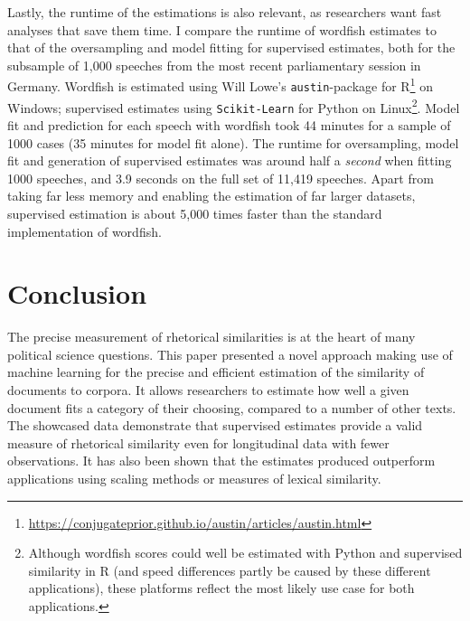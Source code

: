 \documentclass{article}
\begin{document}
Lastly, the runtime of the estimations is also relevant, as researchers want fast analyses that save them time. I compare the runtime of wordfish estimates to that of the oversampling and model fitting for supervised estimates, both for the subsample of 1,000 speeches from the most recent parliamentary session in Germany. Wordfish is estimated using Will Lowe's \texttt{austin}-package for R\footnote{\url{https://conjugateprior.github.io/austin/articles/austin.html}} on Windows; supervised estimates using \texttt{Scikit-Learn} for Python on Linux\footnote{Although wordfish scores could well be estimated with Python and supervised similarity in R (and speed differences partly be caused by these different applications), these platforms reflect the most likely use case for both applications.}. Model fit and prediction for each speech with wordfish took 44 minutes for a sample of 1000 cases (35 minutes for model fit alone). The runtime for oversampling, model fit and generation of supervised estimates was around half a \textit{second} when fitting 1000 speeches, and 3.9 seconds on the full set of 11,419 speeches. Apart from taking far less memory and enabling the estimation of far larger datasets, supervised estimation is about 5,000 times faster than the standard implementation of wordfish.


\section{Conclusion}

The precise measurement of rhetorical similarities is at the heart of many political science questions. This paper presented a novel approach making use of machine learning for the precise and efficient estimation of the similarity of documents to corpora. It allows researchers to estimate how well a given document fits a category of their choosing, compared to a number of other texts. The showcased data demonstrate that supervised estimates provide a valid measure of rhetorical similarity even for longitudinal data with fewer observations. It has also been shown that the estimates produced outperform applications using scaling methods or measures of lexical similarity. \par
\end{document}
